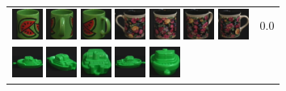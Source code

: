 {\begin{figure}[p]
\begin{tabular}{m{11cm} | m{3cm} |}
\includegraphics[width=1cm]{coil/beeld-32.eps}
\includegraphics[width=1cm]{coil/beeld-35.eps}
\includegraphics[width=1cm]{coil/beeld-34.eps}
\includegraphics[width=1cm]{coil/beeld-61.eps}
\includegraphics[width=1cm]{coil/beeld-62.eps}
\includegraphics[width=1cm]{coil/beeld-63.eps}
\includegraphics[width=1cm]{coil/beeld-60.eps}
& {\scriptsize 0.0}
\\
\includegraphics[width=1cm]{coil/beeld-54.eps}
\includegraphics[width=1cm]{coil/beeld-58.eps}
\includegraphics[width=1cm]{coil/beeld-59.eps}
\includegraphics[width=1cm]{coil/beeld-55.eps}
\includegraphics[width=1cm]{coil/beeld-56.eps}

\end{tabular}
\end{figure}}
